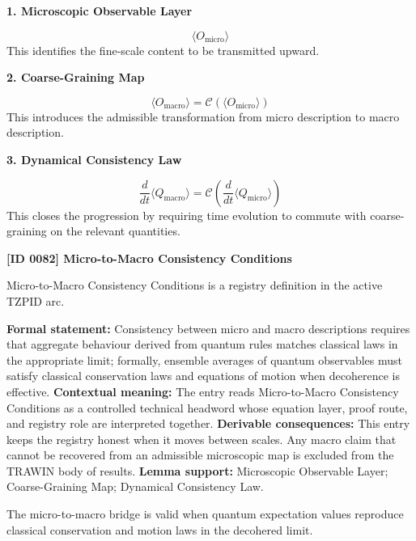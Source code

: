 \noindent\textbf{1. Microscopic Observable Layer}\par
\[
\langle O_{\mathrm{micro}} \rangle
\]
\noindent This identifies the fine-scale content to be transmitted upward.\par
\noindent\textbf{2. Coarse-Graining Map}\par
\[
\langle O_{\mathrm{macro}} \rangle
=
\mathcal{C}\!\left(\langle O_{\mathrm{micro}} \rangle\right)
\]
\noindent This introduces the admissible transformation from micro description to macro description.\par
\noindent\textbf{3. Dynamical Consistency Law}\par
\[
\frac{d}{dt}\langle Q_{\mathrm{macro}} \rangle
=
\mathcal{C}\!\left(\frac{d}{dt}\langle Q_{\mathrm{micro}} \rangle\right)
\]
\noindent This closes the progression by requiring time evolution to commute with coarse-graining on the relevant quantities.\par

\clearpage
\noindent\textbf{[ID 0082] Micro-to-Macro Consistency Conditions}\par
\vspace{0.35em}
\begingroup\small
{}
Micro-to-Macro Consistency Conditions is a registry definition in the active TZPID arc.

\begingroup\footnotesize\setlength{\emergencystretch}{3em}\sloppy
\textbf{Formal statement:} Consistency between micro and macro descriptions requires that aggregate behaviour derived from quantum rules matches classical laws in the appropriate limit; formally, ensemble averages of quantum observables must satisfy classical conservation laws and equations of motion when decoherence is effective. \textbf{Contextual meaning:} The entry reads Micro-to-Macro Consistency Conditions as a controlled technical headword whose equation layer, proof route, and registry role are interpreted together. \textbf{Derivable consequences:} This entry keeps the registry honest when it moves between scales. Any macro claim that cannot be recovered from an admissible microscopic map is excluded from the TRAWIN body of results. \textbf{Lemma support:} Microscopic Observable Layer; Coarse-Graining Map; Dynamical Consistency Law.\par
\endgroup

The micro-to-macro bridge is valid when quantum expectation values reproduce classical conservation and motion laws in the decohered limit.

